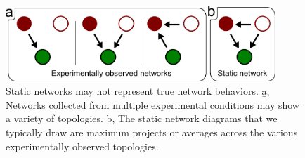   \begin{figure}[!bt]
  \centering
  \includegraphics[width=4in]{FIGS/introduction/xtalk.pdf}
  {\singlespacing 
  \caption[Static networks may not represent true network behaviors.]
            { Static networks may not represent true network behaviors.
            \b{a}, Networks collected from multiple experimental conditions
            may show a variety of topologies. \b{b}, The static network
            diagrams that we typically draw are maximum projects or averages
            across the various experimentally observed topologies.}
  \label{fig:introduction:xtalk}}
  \end{figure}